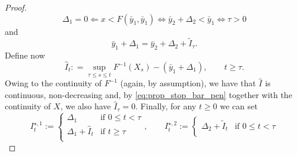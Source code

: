 \documentclass[10pt]{article}
\numberwithin{equation}{section}
\theoremstyle{plain}
\numberwithin{theorem}{section}
\theoremstyle{definition}
\def \b {{\beta}}
\newcommand{\<}{\langle}
\renewcommand{\>}{\rangle}
\renewcommand{\(}{\left(}
\renewcommand{\)}{\right)}
\def \b {{\beta}}
\def \tilde {\widetilde}
\begin{document}
{{{\begin{proof}
\begin{equation}
\Delta_1 = 0 \Longleftarrow x< F(\bar y_1, \bar y_1) \Longleftrightarrow \bar y_2 + \Delta_2 < \bar y_1  \Longleftrightarrow  \tau > 0   
\end{equation}
and
\begin{equation}\label{eq:prop_stop_bar_exa}
\bar y_1 + \Delta_1 = \bar y_2 + \Delta_2+\tilde I_{ \tau} .
\end{equation}
Define now
\begin{equation}%
\hat I_{t}: = \sup\limits_{ \tau \leq s \leq t}  F^{-1}(X_s) - ( \bar y_1 + \Delta_1 ) ,%
 \qquad   t\geq \tau.
\end{equation} 
Owing to %
the continuity of $F^{-1}$ (again, by assumption), we have that $\hat I$ is continuous, non-decreasing and, by \eqref{eq:prop_stop_bar_pen} together with the continuity of $ X$, we also have $\hat I_{ \tau} = 0$. %
Finally, for any $t\geq 0$ we can set
\begin{equation}%
I^{\star,1}_t := \begin{cases}
\Delta_1 & \text{if }  0\leq t<\tau \\
\Delta_1 + \hat I_t & \text{if }  t \geq\tau \\
\end{cases}, \qquad 
I^{\star,2}_t:= \begin{cases}
\Delta_2+\tilde I_t & \text{if }  0 \leq t<\tau \\

\end{cases}
\end{equation}
\end{proof}}}}
\end{document}
